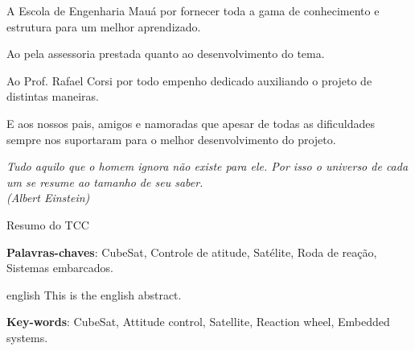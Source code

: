 \documentclass[
	12pt,				%
	openany,			%
	twoside,			%
	a4paper,			%
	english,			%
	french,				%
	spanish,			%
	brazil,				%
	oldfontcommands
	]{abntex2}
\begin{document}
\begin{agradecimentos}

A Escola de Engenharia Mauá por fornecer toda a gama de conhecimento e estrutura para um melhor aprendizado.\par

Ao {\imprimirorientador}  pela assessoria prestada quanto ao desenvolvimento do tema.\par

Ao Prof. Rafael Corsi por todo empenho dedicado auxiliando o projeto de distintas maneiras.\par

E aos nossos pais, amigos e namoradas que apesar de todas as dificuldades sempre nos suportaram para o melhor desenvolvimento do projeto.

\end{agradecimentos}

\begin{epigrafe}
    \vspace*{\fill}
	\begin{flushright}
		\textit{Tudo aquilo que o homem ignora não existe para ele. Por isso o universo de cada um se resume ao tamanho de seu saber.\\(Albert Einstein)}
	\end{flushright}
\end{epigrafe}

\setlength{\absparsep}{18pt} %
\begin{resumo}
 Resumo do TCC

 \textbf{Palavras-chaves}: CubeSat, Controle de atitude, Satélite, Roda de reação, Sistemas embarcados.
\end{resumo}

\begin{resumo}[Abstract]
 \begin{otherlanguage*}{english}
   This is the english abstract.

   \vspace{\onelineskip}
 
   \noindent 
   \textbf{Key-words}: CubeSat, Attitude control, Satellite, Reaction wheel, Embedded systems.
 \end{otherlanguage*}
\end{resumo}

\listoffigures*
\cleardoublepage
\end{document}
